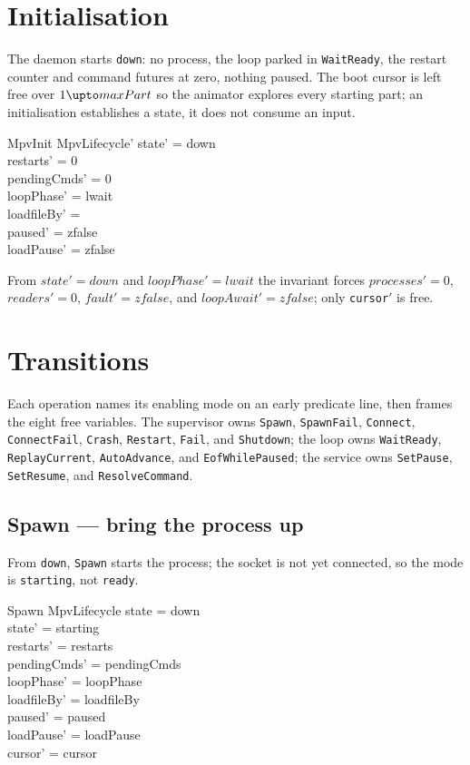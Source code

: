 \documentclass[a4paper,10pt,fleqn]{article}
\begin{document}
\section{Initialisation}

The daemon starts \texttt{down}: no process, the loop parked in
\texttt{WaitReady}, the restart counter and command futures at zero, nothing
paused. The boot cursor is left free over $1 \upto maxPart$ so the animator
explores every starting part; an initialisation establishes a state, it does
not consume an input.

\begin{schema}{MpvInit}
  MpvLifecycle'
  \where
  state' = down \\
  restarts' = 0 \\
  pendingCmds' = 0 \\
  loopPhase' = lwait \\
  loadfileBy' = \emptyset \\
  paused' = zfalse \\
  loadPause' = zfalse
\end{schema}

From $state' = down$ and $loopPhase' = lwait$ the invariant forces
$processes' = 0$, $readers' = 0$, $fault' = zfalse$, and $loopAwait' =
zfalse$; only \texttt{cursor$'$} is free.

\section{Transitions}

Each operation names its enabling mode on an early predicate line, then frames
the eight free variables. The supervisor owns \texttt{Spawn}, \texttt{SpawnFail},
\texttt{Connect}, \texttt{ConnectFail}, \texttt{Crash}, \texttt{Restart},
\texttt{Fail}, and \texttt{Shutdown}; the loop owns \texttt{WaitReady},
\texttt{ReplayCurrent}, \texttt{AutoAdvance}, and \texttt{EofWhilePaused}; the
service owns \texttt{SetPause}, \texttt{SetResume}, and \texttt{ResolveCommand}.

\subsection{Spawn --- bring the process up}
\label{sec:spawn}

From \texttt{down}, \texttt{Spawn} starts the process; the socket is not yet
connected, so the mode is \texttt{starting}, not \texttt{ready}.

\begin{schema}{Spawn}
  \Delta MpvLifecycle
  \where
  state = down \\
  state' = starting \\
  restarts' = restarts \\
  pendingCmds' = pendingCmds \\
  loopPhase' = loopPhase \\
  loadfileBy' = loadfileBy \\
  paused' = paused \\
  loadPause' = loadPause \\
  cursor' = cursor
\end{schema}
\end{document}
